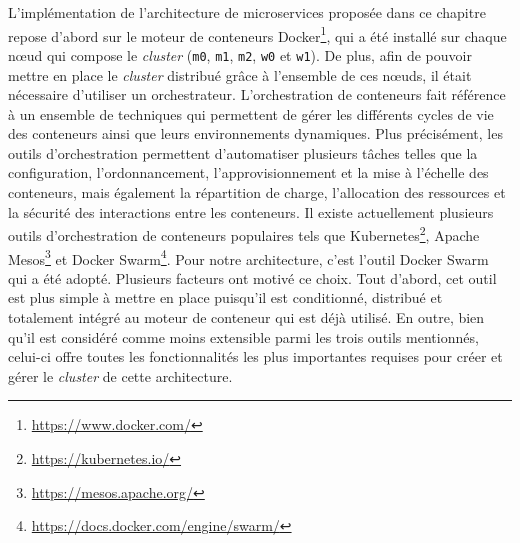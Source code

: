 L'implémentation de l'architecture de microservices proposée dans ce chapitre repose d'abord sur le moteur de conteneurs Docker\footnote{\url{https://www.docker.com/}}, qui a été installé sur chaque n\oe{}ud qui compose le \textit{cluster} (\texttt{m0}, \texttt{m1}, \texttt{m2}, \texttt{w0} et \texttt{w1}). De plus, afin de pouvoir mettre en place le \textit{cluster} distribué grâce à l'ensemble de ces n\oe{}uds, il était nécessaire d'utiliser un orchestrateur. L'orchestration de conteneurs fait référence à un ensemble de techniques qui permettent de gérer les différents cycles de vie des conteneurs ainsi que leurs environnements dynamiques. Plus précisément, les outils d'orchestration permettent d'automatiser plusieurs tâches telles que la configuration, l'ordonnancement, l'approvisionnement et la mise à l'échelle des conteneurs, mais également la répartition de charge, l'allocation des ressources et la sécurité des interactions entre les conteneurs. Il existe actuellement plusieurs outils d'orchestration de conteneurs populaires tels que Kubernetes\footnote{\url{https://kubernetes.io/}}, Apache Mesos\footnote{\url{https://mesos.apache.org/}} et Docker Swarm\footnote{\url{https://docs.docker.com/engine/swarm/}}. Pour notre architecture, c'est l'outil Docker Swarm qui a été adopté. Plusieurs facteurs ont motivé ce choix. Tout d'abord, cet outil est plus simple à mettre en place puisqu'il est conditionné, distribué et totalement intégré au moteur de conteneur qui est déjà utilisé. En outre, bien qu'il est considéré comme moins extensible parmi les trois outils mentionnés, celui-ci offre toutes les fonctionnalités les plus importantes requises pour créer et gérer le \textit{cluster} de cette architecture.

